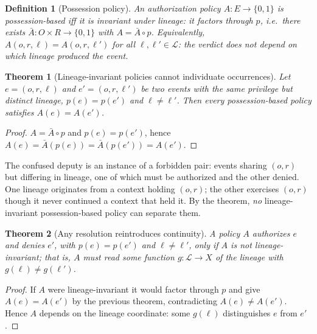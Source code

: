 \documentclass[11pt]{article}
\newtheorem{definition}{Definition}
\newtheorem{theorem}{Theorem}
\begin{document}
\begin{definition}[Possession policy]
An authorization policy $A : E \to \{0,1\}$ is \emph{possession-based} iff it is
invariant under lineage: it factors through $p$, i.e.\ there exists
$\bar{A} : O \times R \to \{0,1\}$ with $A = \bar{A} \circ p$. Equivalently,
$A(o,r,\ell) = A(o,r,\ell')$ for all $\ell, \ell' \in \mathcal{L}$: the verdict
does not depend on which lineage produced the event.
\end{definition}

\begin{theorem}[Lineage-invariant policies cannot individuate occurrences]
Let $e = (o,r,\ell)$ and $e' = (o,r,\ell')$ be two events with the same privilege
but distinct lineage, $p(e) = p(e')$ and $\ell \neq \ell'$. Then every
possession-based policy satisfies $A(e) = A(e')$.
\end{theorem}

\begin{proof}
$A = \bar{A} \circ p$ and $p(e) = p(e')$, hence
$A(e) = \bar{A}(p(e)) = \bar{A}(p(e')) = A(e')$.
\end{proof}

The confused deputy is an instance of a forbidden pair:
events sharing $(o,r)$ but differing in lineage, one of which must be authorized
and the other denied. One lineage originates from a context holding $(o,r)$; the
other exercises $(o,r)$ though it never continued a context that held it. By the
theorem, \emph{no} lineage-invariant possession-based policy can separate them.

\begin{theorem}[Any resolution reintroduces continuity]\label{thm:reintro}
A policy $A$ authorizes $e$ and denies $e'$, with $p(e) = p(e')$ and
$\ell \neq \ell'$, only if $A$ is not lineage-invariant; that is, $A$ must read
some function $g : \mathcal{L} \to X$ of the lineage with $g(\ell) \neq g(\ell')$.
\end{theorem}

\begin{proof}
If $A$ were lineage-invariant it would factor through $p$ and give
$A(e) = A(e')$ by the previous theorem, contradicting $A(e) \neq A(e')$. Hence
$A$ depends on the lineage coordinate: some $g(\ell)$ distinguishes $e$ from
$e'$.
\end{proof}
\end{document}
